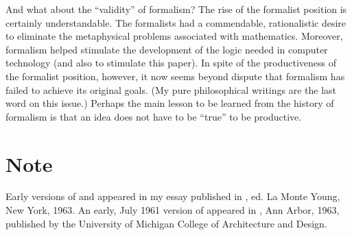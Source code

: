And what about the \enquote{validity} of formalism? The rise of the formalist 
position is certainly understandable. The formalists had a commendable, 
rationalistic desire to eliminate the metaphysical problems associated with 
mathematics. Moreover, formalism helped stimulate the development of the 
logic needed in computer technology (and also to stimulate this paper). In 
spite of the productiveness of the formalist position, however, it now seems 
beyond dispute that formalism has failed to achieve its original goals. (My 
pure philosophical writings are the last word on this issue.) Perhaps the main 
lesson to be learned from the history of formalism is that an idea does not 
have to be \enquote{true} to be productive. 


\section*{Note}
Early versions of  and  appeared in my essay 
 published in , ed. La Monte Young, New 
York, 1963. An early, July 1961 version of  appeared in , Ann Arbor, 1963, 
published by the University of Michigan College of Architecture and Design. 

